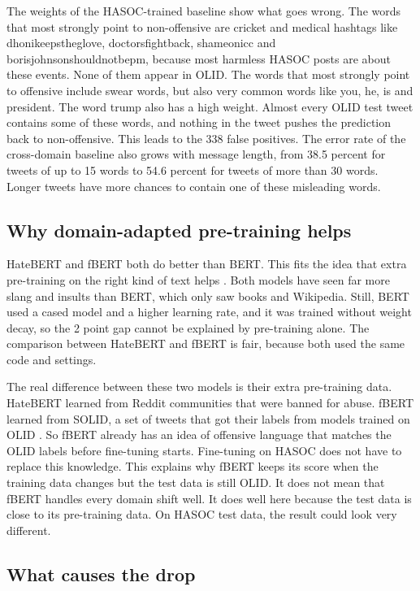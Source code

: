 \documentclass[11pt,a4paper]{article}
\begin{document}
The weights of the HASOC-trained baseline show what goes wrong. The words that most strongly point to non-offensive are cricket and medical hashtags like dhonikeepstheglove, doctorsfightback, shameonicc and borisjohnsonshouldnotbepm, because most harmless HASOC posts are about these events. None of them appear in OLID. The words that most strongly point to offensive include swear words, but also very common words like you, he, is and president. The word trump also has a high weight. Almost every OLID test tweet contains some of these words, and nothing in the tweet pushes the prediction back to non-offensive. This leads to the 338 false positives. The error rate of the cross-domain baseline also grows with message length, from 38.5 percent for tweets of up to 15 words to 54.6 percent for tweets of more than 30 words. Longer tweets have more chances to contain one of these misleading words.

\subsection{Why domain-adapted pre-training helps}

HateBERT and fBERT both do better than BERT. This fits the idea that extra pre-training on the right kind of text helps \citep{gururangan2020dont}. Both models have seen far more slang and insults than BERT, which only saw books and Wikipedia. Still, BERT used a cased model and a higher learning rate, and it was trained without weight decay, so the 2 point gap cannot be explained by pre-training alone. The comparison between HateBERT and fBERT is fair, because both used the same code and settings.

The real difference between these two models is their extra pre-training data. HateBERT learned from Reddit communities that were banned for abuse. fBERT learned from SOLID, a set of tweets that got their labels from models trained on OLID \citep{rosenthal2021solid}. So fBERT already has an idea of offensive language that matches the OLID labels before fine-tuning starts. Fine-tuning on HASOC does not have to replace this knowledge. This explains why fBERT keeps its score when the training data changes but the test data is still OLID. It does not mean that fBERT handles every domain shift well. It does well here because the test data is close to its pre-training data. On HASOC test data, the result could look very different.

\subsection{What causes the drop}
\end{document}
